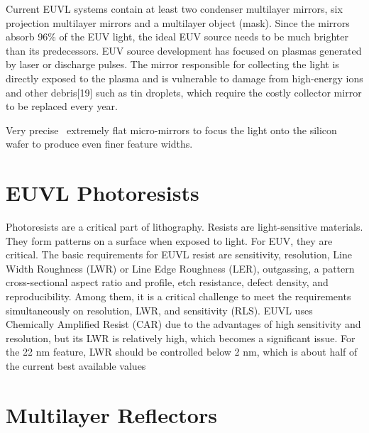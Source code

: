 \documentclass[12pt,a4paper]{report}
\begin{document}
Current EUVL systems contain at least two 
condenser multilayer mirrors, six projection multilayer 
mirrors and a multilayer object (mask). Since 
the mirrors absorb 96\% of the EUV light, the ideal 
EUV source needs to be much brighter than its 
predecessors. EUV source development has focused on 
plasmas generated by laser or discharge pulses. 
The mirror responsible for collecting the light is 
directly exposed to the plasma and is vulnerable 
to damage from high-energy ions and other 
debris[19] such as tin droplets, which require 
the costly collector mirror to be replaced every year.

Very precise  extremely flat micro-mirrors to 
focus the light onto the silicon wafer to 
produce even finer feature widths.





\section{EUVL Photoresists}

Photoresists are a critical part of lithography. Resists are 
light-sensitive materials. 
They form patterns on a surface when exposed to light. For EUV, 
they are critical.
The basic requirements for EUVL resist are sensitivity, 
resolution, Line Width Roughness 
(LWR) or Line Edge Roughness (LER), outgassing, a pattern 
cross-sectional aspect ratio 
and profile, etch resistance, defect density, and 
reproducibility. Among them, 
it is a critical challenge to meet the requirements 
simultaneously on resolution, 
LWR, and sensitivity (RLS). EUVL uses Chemically Amplified 
Resist (CAR) due to 
the advantages of high sensitivity and resolution, but its 
LWR is relatively high, 
which becomes a significant issue. For the 22 nm feature, 
LWR should be 
controlled below 2 nm, which is about half of the current 
best available values
\section{Multilayer Reflectors}
\end{document}
